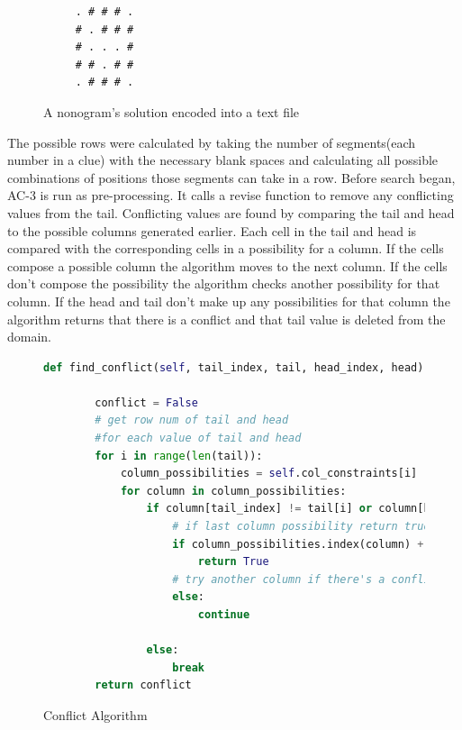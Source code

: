 \documentclass[12pt, letterpaper]
{article}
\begin{document}
\begin{figure}[H]
    \caption{A nonogram's solution encoded into a text file}
    \begin{lstlisting}
     . # # # .
     # . # # #
     # . . . #
     # # . # #
     . # # # .
    \end{lstlisting}
\end{figure}

% 

The possible rows were calculated by taking the number of segments(each number in a clue) with the necessary blank spaces and calculating all possible combinations of positions those segments can take in a row. Before search began, AC-3 is run as pre-processing. It calls a revise function to remove any conflicting values from the tail. Conflicting values are found by comparing the tail and head to the possible columns generated earlier. Each cell in the tail and head is compared with the corresponding cells in a possibility for a column. If the cells compose a possible column the algorithm moves to the next column. If the cells don't compose the possibility the algorithm checks another possibility for that column. If the head and tail don't make up any possibilities for that column the algorithm returns that there is a conflict and that tail value is deleted from the domain.


\begin{figure}[H]
    \caption{Conflict Algorithm}
    \label{code.1}
    \begin{lstlisting}[language=Python]
    def find_conflict(self, tail_index, tail, head_index, head):
           
        conflict = False
        # get row num of tail and head
        #for each value of tail and head
        for i in range(len(tail)):
            column_possibilities = self.col_constraints[i]
            for column in column_possibilities:
                if column[tail_index] != tail[i] or column[head_index] != head[i]:
                    # if last column possibility return true
                    if column_possibilities.index(column) + 1 == len(column_possibilities):
                        return True
                    # try another column if there's a conflict
                    else:
                        continue
                    
                else:
                    break
        return conflict
    \end{lstlisting}
\end{figure}
\end{document}
